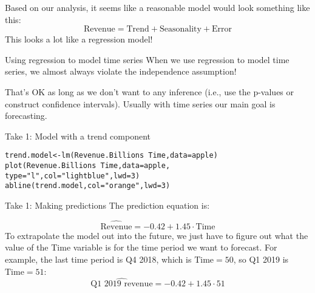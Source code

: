 \documentclass{beamer}\usepackage[]{graphicx}\usepackage[]{color}
\makeatletter
\newcommand{\hlnum}[1]{\textcolor[rgb]{0.824,0.412,0.118}{#1}}%
\newcommand{\hlstr}[1]{\textcolor[rgb]{1,0.894,0.71}{#1}}%
\newcommand{\hlopt}[1]{\textcolor[rgb]{1,0.894,0.769}{#1}}%
\newcommand{\hlstd}[1]{\textcolor[rgb]{1,0.894,0.769}{#1}}%
\newcommand{\hlkwb}[1]{\textcolor[rgb]{0.804,0.776,0.451}{#1}}%
\newcommand{\hlkwc}[1]{\textcolor[rgb]{0.78,0.941,0.545}{#1}}%
\newcommand{\hlkwd}[1]{\textcolor[rgb]{1,0.78,0.769}{#1}}%
\newenvironment{kframe}{%
 \def\at@end@of@kframe{}%
 \ifinner\ifhmode%
  \def\at@end@of@kframe{\end{minipage}}%
  \begin{minipage}{\columnwidth}%
 \fi\fi%
 \def\FrameCommand##1{\hskip\@totalleftmargin \hskip-\fboxsep
 \colorbox{shadecolor}{##1}\hskip-\fboxsep
     \hskip-\linewidth \hskip-\@totalleftmargin \hskip\columnwidth}%
 \MakeFramed {\advance\hsize-\width
   \@totalleftmargin\z@ \linewidth\hsize
   \@setminipage}}%
 {\par\unskip\endMakeFramed%
 \at@end@of@kframe}
\newenvironment{knitrout}{}{} %
\makeatother
\begin{document}
\begin{darkframes}
    \begin{frame}
      Based on our analysis, it seems like a reasonable model would look something like   this:
      \[
        \text{Revenue} = \text{Trend} + \text{Seasonality} + \text{Error}
      \]
      This looks a lot like a regression model!
    \end{frame}

    \begin{frame}{Using regression to model time series}
      When we use regression to model time series, we almost always violate the independence assumption!

      \bigskip\pause

      That's OK as long as we don't want to any inference (i.e., use the p-values or construct confidence intervals). Usually with time series our main goal is \alert{forecasting}.
    \end{frame}

    \begin{frame}[fragile]{Take 1: Model with a trend component}
      \fontvsm
\begin{knitrout}
\begin{kframe}
\begin{alltt}
\hlstd{trend.model} \hlkwb{<-} \hlkwd{lm}\hlstd{(Revenue.Billions} \hlopt{~} \hlstd{Time,} \hlkwc{data}\hlstd{=apple)}
\hlkwd{plot}\hlstd{(Revenue.Billions} \hlopt{~} \hlstd{Time,} \hlkwc{data}\hlstd{=apple,}
  \hlkwc{type}\hlstd{=}\hlstr{"l"}\hlstd{,} \hlkwc{col}\hlstd{=}\hlstr{"lightblue"}\hlstd{,} \hlkwc{lwd}\hlstd{=}\hlnum{3}\hlstd{)}
\hlkwd{abline}\hlstd{(trend.model,} \hlkwc{col}\hlstd{=}\hlstr{"orange"}\hlstd{,} \hlkwc{lwd}\hlstd{=}\hlnum{3}\hlstd{)}
\end{alltt}
\end{kframe}


\end{knitrout}
    \end{frame}

    \begin{frame}{Take 1: Making predictions}
      The prediction equation is:

      \[
        \widehat{\text{Revenue}} =
          -0.42 +
          1.45 \cdot\text{Time}
      \]
      To extrapolate the model out into the future, we just have to figure out what the value of the Time variable is for the time period we want to  forecast. \pause For example, the last time period is Q4 2018, which is $\text{Time}=50$, so Q1 2019 is $\text{Time}=51$:
      \[
        \widehat{\text{Q1 2019 revenue}} =
          -0.42 +
          1.45 \cdot 51
      \]
    \end{frame}


\end{darkframes}
\end{document}
